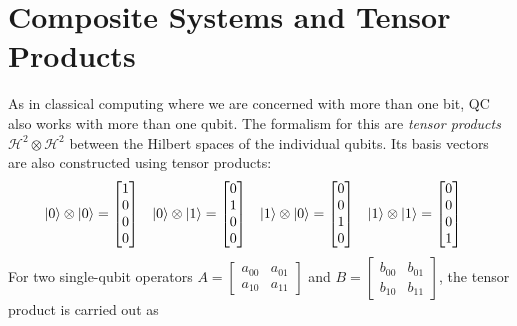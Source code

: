 	\section{Composite Systems and Tensor Products}
		\label{sec:composite}

		As in classical computing where we are concerned with more than one bit, \ac{QC} also works with more than one qubit. The formalism for this are \emph{tensor products} \( \mathcal{H}^2 \otimes \mathcal{H}^2 \) between the Hilbert spaces of the individual qubits. Its basis vectors are also constructed using tensor products:
		\begin{align}
			\ket{0} \otimes \ket{0} & = \begin{bmatrix} 1 \\ 0 \\ 0 \\ 0 \end{bmatrix} &
			\ket{0} \otimes \ket{1} & = \begin{bmatrix} 0 \\ 1 \\ 0 \\ 0 \end{bmatrix} &
			\ket{1} \otimes \ket{0} & = \begin{bmatrix} 0 \\ 0 \\ 1 \\ 0 \end{bmatrix} &
			\ket{1} \otimes \ket{1} & = \begin{bmatrix} 0 \\ 0 \\ 0 \\ 1 \end{bmatrix}
		\end{align}
		For two single-qubit operators \( A = \begin{bmatrix} a_{00} & a_{01} \\ a_{10} & a_{11} \end{bmatrix} \) and \( B = \begin{bmatrix} b_{00} & b_{01} \\ b_{10} & b_{11} \end{bmatrix} \), the tensor product is carried out as
